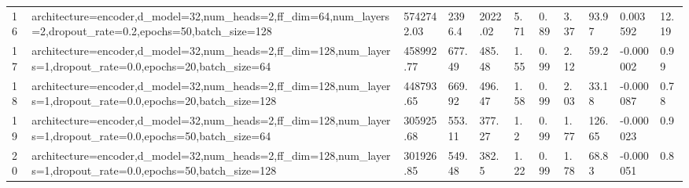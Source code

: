 \begin{longtable}{C{0.8cm} L{2cm} C{1.15cm} C{1.15cm} C{1.15cm} C{1.15cm} C{0.85cm} C{1.25cm} C{1.2cm} C{1.5cm} C{1.0cm}}
16 & architecture=encoder,\newline d\_model=32,\newline num\_heads=2,\newline ff\_dim=64,\newline num\_layers=2,\newline dropout\_rate=0.2,\newline epochs=50,\newline batch\_size=128 & 5742742.03 & 2396.4 & 2022.02 & 5.71 & 0.89 & 3.37 & 93.97 & 0.003592 & 12.19 \\
17 & architecture=encoder,\newline d\_model=32,\newline num\_heads=2,\newline ff\_dim=128,\newline num\_layers=1,\newline dropout\_rate=0.0,\newline epochs=20,\newline batch\_size=64 & 458992.77 & 677.49 & 485.48 & 1.55 & 0.99 & 2.12 & 59.2 & -0.000002 & 0.99 \\
18 & architecture=encoder,\newline d\_model=32,\newline num\_heads=2,\newline ff\_dim=128,\newline num\_layers=1,\newline dropout\_rate=0.0,\newline epochs=20,\newline batch\_size=128 & 448793.65 & 669.92 & 496.47 & 1.58 & 0.99 & 2.03 & 33.18 & -0.000087 & 0.78 \\
19 & architecture=encoder,\newline d\_model=32,\newline num\_heads=2,\newline ff\_dim=128,\newline num\_layers=1,\newline dropout\_rate=0.0,\newline epochs=50,\newline batch\_size=64 & 305925.68 & 553.11 & 377.27 & 1.2 & 0.99 & 1.77 & 126.65 & -0.000023 & 0.9 \\
20 & architecture=encoder,\newline d\_model=32,\newline num\_heads=2,\newline ff\_dim=128,\newline num\_layers=1,\newline dropout\_rate=0.0,\newline epochs=50,\newline batch\_size=128 & 301926.85 & 549.48 & 382.5 & 1.22 & 0.99 & 1.78 & 68.83 & -0.000051 & 0.8 \\

\end{longtable}
